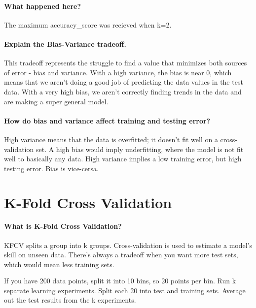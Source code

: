 \documentclass[11pt]{article}
\begin{document}
    \paragraph{What happened here?}\label{what-happened-here}

    The maximum accuracy\_score was recieved when k=2.

    \paragraph{Explain the Bias-Variance
tradeoff.}\label{explain-the-bias-variance-tradeoff.}

    This tradeoff represents the struggle to find a value that minimizes
both sources of error - bias and variance. With a high variance, the
bias is near 0, which means that we aren't doing a good job of
predicting the data values in the test data. With a very high bias, we
aren't correctly finding trends in the data and are making a super
general model.

    \paragraph{How do bias and variance affect training and testing
error?}\label{how-do-bias-and-variance-affect-training-and-testing-error}

    High variance means that the data is overfitted; it doesn't fit well on
a cross-validation set. A high bias would imply underfitting, where the
model is not fit well to basically any data. High variance implies a low
training error, but high testing error. Bias is vice-cersa.

    \section{K-Fold Cross Validation}\label{k-fold-cross-validation}

    \paragraph{What is K-Fold Cross
Validation?}\label{what-is-k-fold-cross-validation}

    KFCV splits a group into k groups. Cross-validation is used to estimate
a model's skill on unseen data. There's always a tradeoff when you want
more test sets, which would mean less training sets.

If you have 200 data points, split it into 10 bins, so 20 points per
bin. Run k separate learning experiments. Split each 20 into test and
training sets. Average out the test results from the k experiments.
\end{document}

